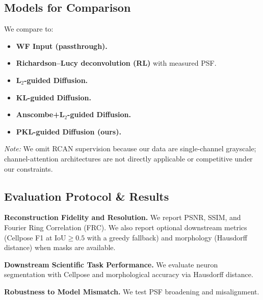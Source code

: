 \documentclass{article}
\begin{document}
\subsection{Models for Comparison}
We compare to:
\begin{itemize}
    \item \textbf{WF Input (passthrough).}
    \item \textbf{Richardson--Lucy deconvolution (RL)} with measured PSF.
    \item \textbf{L$_2$-guided Diffusion.}
    \item \textbf{KL-guided Diffusion.}
    \item \textbf{Anscombe+L$_2$-guided Diffusion.}
    \item \textbf{PKL-guided Diffusion (ours).}
\end{itemize}
\textit{Note:} We omit RCAN supervision because our data are single-channel grayscale; channel-attention architectures are not directly applicable or competitive under our constraints.

\subsection{Evaluation Protocol \& Results}
\textbf{Reconstruction Fidelity and Resolution.} We report PSNR, SSIM, and Fourier Ring Correlation (FRC). We also report optional downstream metrics (Cellpose F1 at IoU$\ge 0.5$ with a greedy fallback) and morphology (Hausdorff distance) when masks are available.



\textbf{Downstream Scientific Task Performance.} We evaluate neuron segmentation with Cellpose and morphological accuracy via Hausdorff distance.


\textbf{Robustness to Model Mismatch.} We test PSF broadening and misalignment.


\end{document}
